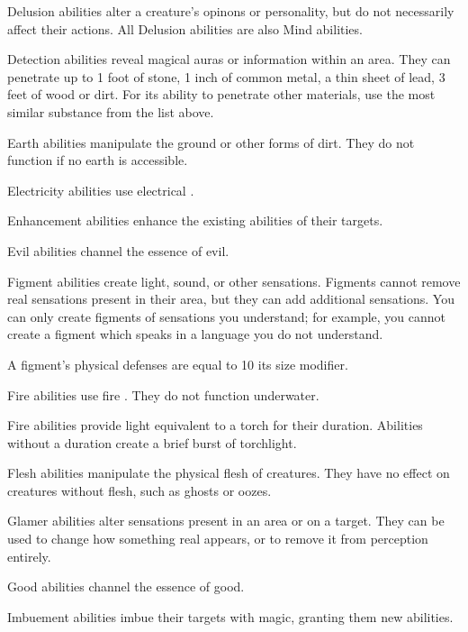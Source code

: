      Delusion abilities alter a creature's opinons or personality, but do not necessarily affect their actions.
    All Delusion abilities are also Mind abilities.

     Detection abilities reveal magical auras or information within an area.
    They can penetrate up to 1 foot of stone, 1 inch of common metal, a thin sheet of lead, 3 feet of wood or dirt.
    For its ability to penetrate other materials, use the most similar substance from the list above.

     Earth abilities manipulate the ground or other forms of dirt.
    They do not function if no earth is accessible.

     Electricity abilities use electrical .

     Enhancement abilities enhance the existing abilities of their targets.

     Evil abilities channel the essence of evil.

     Figment abilities create light, sound, or other sensations.
    Figments cannot remove real sensations present in their area, but they can add additional sensations.
    You can only create figments of sensations you understand; for example, you cannot create a figment which speaks in a language you do not understand.
    \par A figment's physical defenses are equal to 10 \add its size modifier.

     Fire abilities use fire . They do not function underwater.
    \par Fire abilities provide light equivalent to a torch for their duration.
    Abilities without a duration create a brief burst of torchlight.

     Flesh abilities manipulate the physical flesh of creatures.
    They have no effect on creatures without flesh, such as ghosts or oozes.

     Glamer abilities alter sensations present in an area or on a target.
    They can be used to change how something real appears, or to remove it from perception entirely.

     Good abilities channel the essence of good.

     Imbuement abilities imbue their targets with magic, granting them new abilities.

